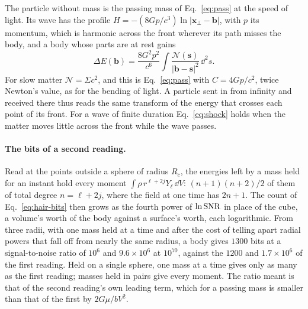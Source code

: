 The particle without mass is the passing mass of Eq.~\eqref{eq:pass} at the
speed of light. Its wave has the profile
$H = -(8Gp/c^3)\ln|\mathbf x_\perp - \mathbf b|$, with $p$ its momentum, which
is harmonic across the front wherever its path misses the body, and a body
whose parts are at rest gains
\begin{equation}\label{eq:massless-pass}
\Delta E(\mathbf b) = \frac{8G^2p^2}{c^6}\int
\frac{\mathcal N(\mathbf s)}{|\mathbf b - \mathbf s|^2}\,\dd^2s .
\end{equation}
For slow matter $\mathcal N = \Sigma c^2$, and this is Eq.~\eqref{eq:pass}
with $C = 4Gp/c^2$, twice Newton's value, as for the bending of light. A
particle sent in from infinity and received there thus reads the same
transform of the energy that crosses each point of its front.
For a wave of finite duration Eq.~\eqref{eq:shock} holds when the matter
moves little across the front while the wave passes.

\paragraph{The bits of a second reading.} Read at the points outside a sphere
of radius $R_c$, the energies left by a mass held for an instant hold every
moment $\int\rho\,r^{\ell+2j}Y_\ell\,\dd V$: $(n+1)(n+2)/2$ of them of total
degree $n = \ell + 2j$, where the field at one time has $2n + 1$. The count of
Eq.~\eqref{eq:hair-bits} then grows as the fourth power of $\ln\mathrm{SNR}$ in place
of the cube, a volume's worth of the body against a surface's worth, each
logarithmic. From three radii, with one mass held at a time and after the cost of telling apart
radial powers that fall off from nearly the same radius, a body gives
$1300$ bits at a signal-to-noise ratio of $10^6$ and $9.6\times10^6$ at
$10^{70}$, against the $1200$ and $1.7\times10^6$ of the first
reading. Held on a single sphere, one mass at a time gives only as many as the
first reading; masses held in pairs give every moment. The ratio meant is that of the second
reading's own leading term, which for a passing mass is smaller than that of
the first by $2G\mu/bV^2$.


